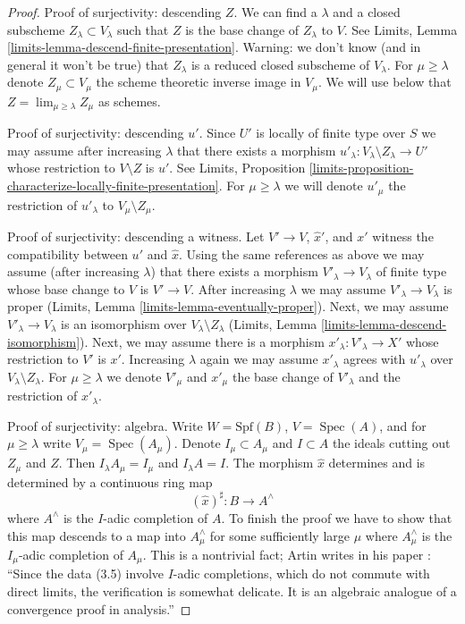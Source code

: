 \documentclass{stacks-project}
\theoremstyle{plain}
\theoremstyle{definition}
\theoremstyle{remark}
\numberwithin{equation}{subsection}
\def\lim{\mathop{\mathrm{lim}}\nolimits}
\def\Spec{\mathop{\mathrm{Spec}}}
\begin{document}
\begin{proof}
\medskip\noindent
Proof of surjectivity: descending $Z$. We can find a $\lambda$
and a closed subscheme $Z_\lambda \subset V_\lambda$ such that
$Z$ is the base change of $Z_\lambda$ to $V$. See
Limits, Lemma \ref{limits-lemma-descend-finite-presentation}.
Warning: we don't know (and in general it won't be true)
that $Z_\lambda$ is a reduced closed subscheme of $V_\lambda$.
For $\mu \geq \lambda$ denote $Z_\mu \subset V_\mu$ the scheme theoretic
inverse image in $V_\mu$. We will use below that
$Z = \lim_{\mu \geq \lambda} Z_\mu$ as schemes.

\medskip\noindent
Proof of surjectivity: descending $u'$.
Since $U'$ is locally of finite type over $S$
we may assume after increasing $\lambda$
that there exists a morphism
$u'_\lambda : V_\lambda \setminus Z_\lambda \to U'$
whose restriction to $V \setminus Z$ is $u'$.
See Limits, Proposition
\ref{limits-proposition-characterize-locally-finite-presentation}.
For $\mu \geq \lambda$ we will denote $u'_\mu$ the restriction
of $u'_\lambda$ to $V_\mu \setminus Z_\mu$.

\medskip\noindent
Proof of surjectivity: descending a witness.
Let $V' \to V$, $\hat x'$, and $x'$ witness the compatibility between
$u'$ and $\hat x$. Using the same references as above we may assume
(after increasing $\lambda$) that there exists a morphism
$V'_\lambda \to V_\lambda$ of finite type whose base change to $V$
is $V' \to V$. After increasing $\lambda$ we may assume
$V'_\lambda \to V_\lambda$ is proper
(Limits, Lemma \ref{limits-lemma-eventually-proper}).
Next, we may assume $V'_\lambda \to V_\lambda$ is an isomorphism
over $V_\lambda \setminus Z_\lambda$
(Limits, Lemma \ref{limits-lemma-descend-isomorphism}).
Next, we may assume there is a morphism $x'_\lambda : V'_\lambda \to X'$
whose restriction to $V'$ is $x'$.
Increasing $\lambda$ again we may assume $x'_\lambda$
agrees with $u'_\lambda$ over $V_\lambda \setminus Z_\lambda$.
For $\mu \geq \lambda$ we denote
$V'_\mu$ and $x'_\mu$ the base change of $V'_\lambda$ and the
restriction of $x'_\lambda$.

\medskip\noindent
Proof of surjectivity: algebra.
Write $W = \text{Spf}(B)$, $V = \Spec(A)$, and
for $\mu \geq \lambda$ write $V_\mu = \Spec(A_\mu)$.
Denote $I_\mu \subset A_\mu$ and $I \subset A$
the ideals cutting out $Z_\mu$ and $Z$.
Then $I_\lambda A_\mu = I_\mu$ and $I_\lambda A = I$.
The morphism $\hat x$ determines and is determined by a
continuous ring map
$$
(\hat x)^\sharp : B \longrightarrow A^\wedge
$$
where $A^\wedge$ is the $I$-adic completion of $A$.
To finish the proof we have to show that this map descends to a map into
$A_\mu^\wedge$ for some sufficiently large $\mu$ where $A_\mu^\wedge$
is the $I_\mu$-adic completion of $A_\mu$.
This is a nontrivial fact; Artin writes in his paper
\cite{ArtinII}: ``Since the data (3.5) involve $I$-adic completions,
which do not commute with direct limits, the verification is somewhat
delicate. It is an algebraic analogue of a convergence proof in analysis.''


\end{proof}
\end{document}
